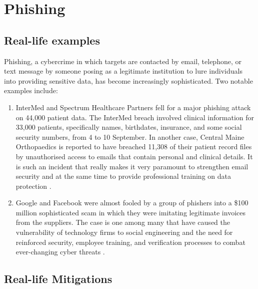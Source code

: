 \section{Phishing}

\subsection{Real-life examples}

Phishing, a cybercrime in which targets are contacted by email, telephone, or text message by someone posing as a legitimate institution to lure individuals into providing sensitive data, has become increasingly sophisticated. Two notable examples include:

\begin{enumerate}
    \item InterMed and Spectrum Healthcare Partners fell for a major phishing attack on 44,000 patient data. The InterMed breach involved clinical information for 33,000 patients, specifically names, birthdates, insurance, and some social security numbers, from 4 to 10 September. In another case, Central Maine Orthopaedics is reported to have breached 11,308 of their patient record files by unauthorised access to emails that contain personal and clinical details. It is such an incident that really makes it very paramount to strengthen email security and at the same time to provide professional training on data protection \cite{HIPAAJournal2020Phishing} .
    \item Google and Facebook were almost fooled by a group of phishers into a \$100 million sophisticated scam in which they were imitating legitimate invoices from the suppliers. The case is one among many that have caused the vulnerability of technology firms to social engineering and the need for reinforced security, employee training, and verification processes to combat ever-changing cyber threats \cite{CNBC2019Phishing}.
\end{enumerate}

\subsection{Real-life Mitigations} 


